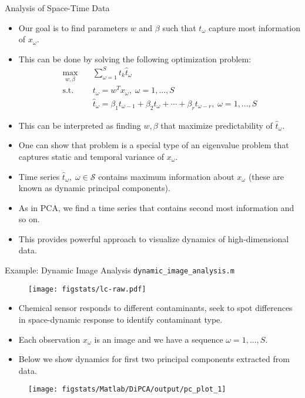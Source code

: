 \documentclass[9pt]{beamer}
\begin{document}
%
\begin{frame}{Analysis of Space-Time Data}

\begin{itemize}
\setlength{\itemsep}{5pt}
\item Our goal is to find parameters $w$ and $\beta$ such that $t_\omega$ capture most information of $x_\omega$.
\item This can be done by solving the following optimization problem:
\begin{align*}
\max_{w,\beta}& \quad \sum_{\omega=1}^{S}t_k\hat{t}_\omega\\
\textrm{s.t.}& \quad t_\omega=w^Tx_\omega,\; \omega=1,...,S\\
& \quad \hat{t}_\omega=\beta_1t_{\omega-1}+\beta_2t_{\omega}+\cdots+\beta_rt_{\omega-r},\; \omega=1,...,S
\end{align*}
\item This can be interpreted as finding $w,\beta$ that maximize predictability of $\hat{t}_\omega$. 
\item One can show that problem is a special type of an eigenvalue problem that captures static and temporal variance of $x_\omega$. 
\item Time series $\hat{t}_\omega,\; \omega\in\mathcal{S}$ contains maximum information about $x_\omega$ (these are known as dynamic principal components).
\item As in PCA, we find a time series that contains second most information and so on.
\item This provides powerful approach to visualize dynamics of high-dimensional data. 
\end{itemize}

\end{frame}

\begin{frame}{Example: Dynamic Image Analysis \footnotesize{\texttt{dynamic\_image\_analysis.m}}}
\begin{figure}[!htb]
    \centering
  \texttt{[image: figstats/lc-raw.pdf]}
  \end{figure}
  \vspace{-0.1in}
  \begin{itemize}
  \setlength{\itemsep}{5pt}
  \item Chemical sensor responds to different contaminants, seek to spot differences in space-dynamic response to identify contaminant type.
  \item Each observation $x_\omega$ is an image and we have a sequence $\omega=1,...,S$.
  \item Below we show dynamics for first two principal components extracted from data.
  \end{itemize}
\begin{figure}[!htb]
    \centering
    \texttt{[image: figstats/Matlab/DiPCA/output/pc\_plot\_1]}
    \end{figure}
\end{frame}
\end{document}
